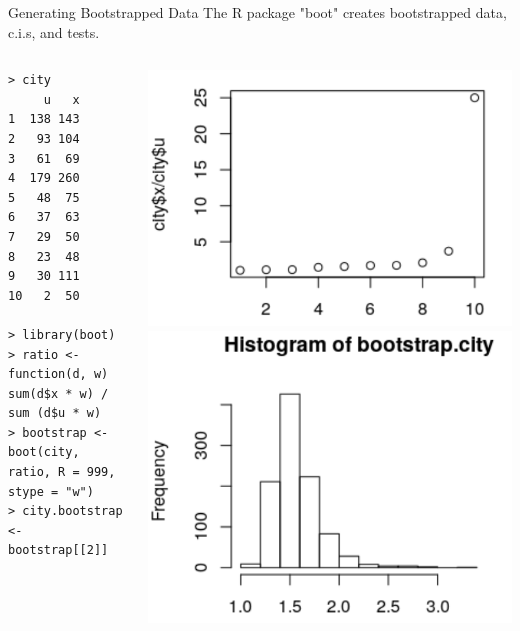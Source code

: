 \begin{frame}[fragile]{Generating Bootstrapped Data}
  The R package "boot" creates bootstrapped data, c.i.s, and tests.
  \begin{columns}[T]
    {\smaller
\begin{verbatim}
> city
     u   x
1  138 143
2   93 104
3   61  69
4  179 260
5   48  75
6   37  63
7   29  50
8   23  48
9   30 111
10   2  50

> library(boot)
> ratio <- function(d, w) sum(d$x * w) / sum (d$u * w)
> bootstrap <- boot(city, ratio, R = 999, stype = "w")
> city.bootstrap <- bootstrap[[2]]
\end{verbatim}
    }
    \includegraphics[width=1\textwidth]{../img/bootstrap_original}
    \includegraphics[width=1\textwidth]{../img/bootstrap_histogram}
  \end{columns}
\end{frame}

